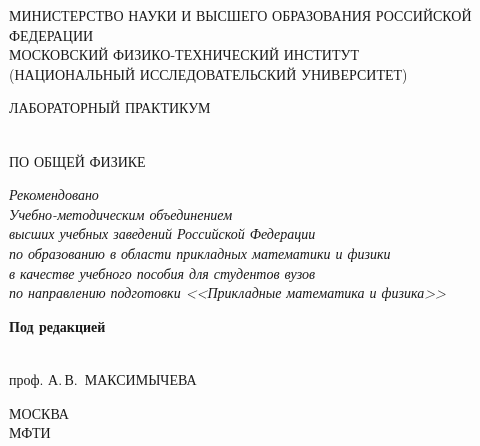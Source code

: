 \setcounter{page}{1}
\thispagestyle{empty}\mbox{}

{\parindent=0pt\centering

{\tiny
МИНИСТЕРСТВО НАУКИ И ВЫСШЕГО ОБРАЗОВАНИЯ РОССИЙСКОЙ ФЕДЕРАЦИИ\\
МОСКОВСКИЙ ФИЗИКО-ТЕХНИЧЕСКИЙ ИНСТИТУТ\\ 
(НАЦИОНАЛЬНЫЙ ИССЛЕДОВАТЕЛЬСКИЙ УНИВЕРСИТЕТ)\par
}

\vskip 20mm

{\bfseries\LARGE\strut ЛАБОРАТОРНЫЙ ПРАКТИКУМ\strut\\ ПО ОБЩЕЙ ФИЗИКЕ\strut}

\vskip 10mm



{\bfseries\Large \MakeUppercase{\nazvan}}

\vskip 10mm

{\it\small Рекомендовано\\ Учебно-методическим объединением\\
высших учебных заведений Российской Федерации\\
по образованию в области прикладных математики и физики\\
в качестве учебного пособия для студентов вузов\\
по направлению подготовки <<Прикладные математика и физика>> }

\vskip 10mm

{\bfseries Под редакцией\strut\\
проф. А.\,В.~МАКСИМЫЧЕВА\strut}

\vfill



{\small МОСКВА\\
МФТИ\\
\god}

}

\newpage
